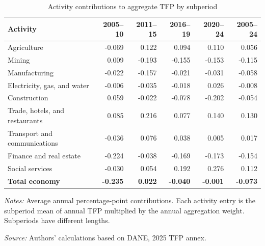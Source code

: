 \begin{table}[H]
\centering
\caption{Activity contributions to aggregate TFP by subperiod}
\label{tab:paper_subperiods}
\footnotesize
\setlength{\tabcolsep}{3pt}
\begin{tabular}{p{4.6cm}rrrrr}
\toprule
Activity & 2005--10 & 2011--15 & 2016--19 & 2020--24 & 2005--24 \\
\midrule
Agriculture & -0.069 & 0.122 & 0.094 & 0.110 & 0.056 \\
Mining & 0.009 & -0.193 & -0.155 & -0.153 & -0.115 \\
Manufacturing & -0.022 & -0.157 & -0.021 & -0.031 & -0.058 \\
Electricity, gas, and water & -0.006 & -0.035 & -0.018 & 0.026 & -0.008 \\
Construction & 0.059 & -0.022 & -0.078 & -0.202 & -0.054 \\
Trade, hotels, and restaurants & 0.085 & 0.216 & 0.077 & 0.140 & 0.130 \\
Transport and communications & -0.036 & 0.076 & 0.038 & 0.005 & 0.017 \\
Finance and real estate & -0.224 & -0.038 & -0.169 & -0.173 & -0.154 \\
Social services & -0.030 & 0.054 & 0.192 & 0.276 & 0.112 \\
\midrule
\textbf{Total economy} & \textbf{-0.235} & \textbf{0.022} & \textbf{-0.040} & \textbf{-0.001} & \textbf{-0.073} \\
\bottomrule
\end{tabular}
\vspace{0.15cm}
\begin{minipage}{0.96\textwidth}
\footnotesize \textit{Notes:} Average annual percentage-point contributions. Each activity entry is the subperiod mean of annual TFP multiplied by the annual aggregation weight. Subperiods have different lengths.
\par\textit{Source:} Authors' calculations based on DANE, 2025 TFP annex.
\end{minipage}
\end{table}
